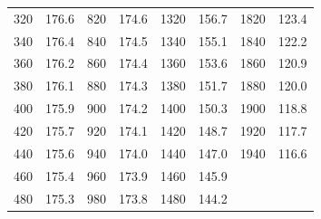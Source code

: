 \documentclass[a4paper]{article}
\begin{document}
\begin{table}[htb]
\begin{tabular}{c|c||c|c||c|c||c|c}
		320	&	176.6	&	820	&	174.6	&	1320	&	156.7	&	1820	&	123.4	\\
		340	&	176.4	&	840	&	174.5	&	1340	&	155.1	&	1840	&	122.2	\\
		360	&	176.2	&	860	&	174.4	&	1360	&	153.6	&	1860	&	120.9	\\
		380	&	176.1	&	880	&	174.3	&	1380	&	151.7	&	1880	&	120.0	\\
		400	&	175.9	&	900	&	174.2	&	1400	&	150.3	&	1900	&	118.8	\\
		420	&	175.7	&	920	&	174.1	&	1420	&	148.7	&	1920	&	117.7	\\
		440	&	175.6	&	940	&	174.0	&	1440	&	147.0	&	\cellcolor{yellow}1940	&	\cellcolor{yellow}116.6	\\
		460	&	175.4	&	960	&	173.9	&	1460	&	145.9	&		&		\\
		480	&	175.3	&	980	&	173.8	&	1480	&	144.2	&		&	\\
		\hline\hline
	\end{tabular}
\end{table}
\end{document}
